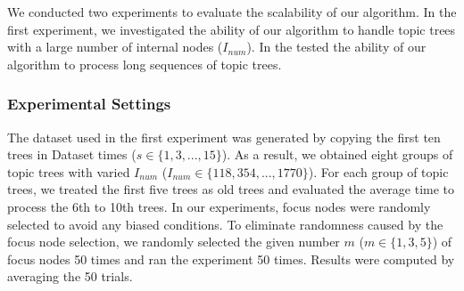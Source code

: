 We conducted two experiments to evaluate the scalability of our algorithm.
In the first experiment, we investigated the ability of our algorithm to handle topic trees with a large number of internal nodes ($I_{num}$).
In the  tested the ability of our algorithm to process long sequences of topic trees.



\subsubsection{Experimental Settings}

The dataset used in the first experiment was generated by copying the first ten trees in Dataset  times ($s\in \{1,3,...,15\}$).
As a result, we obtained eight groups of topic trees with varied $I_{num}$ ($I_{num}\in\{118, 354, ..., 1770\}$). %
For each group of topic trees, we treated the first five trees as old trees and evaluated the average time to process the 6th to 10th trees. %
In our experiments, focus nodes were randomly selected to avoid any biased conditions.
To eliminate randomness caused by the focus node selection, we randomly selected the given number $m$ ($m\in\{1,3,5\}$) of focus nodes 50 times and ran the experiment 50 times.
Results were computed by averaging the 50 trials.

